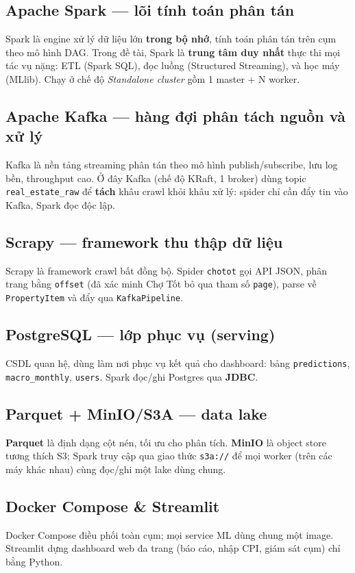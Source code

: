 \documentclass[12pt,a4paper]{article}
\begin{document}
\subsection{Apache Spark --- lõi tính toán phân tán}
Spark là engine xử lý dữ liệu lớn \textbf{trong bộ nhớ}, tính toán phân tán trên cụm theo mô hình DAG. Trong đề tài, Spark là \textbf{trung tâm duy nhất} thực thi mọi tác vụ nặng: ETL (Spark SQL), đọc luồng (Structured Streaming), và học máy (MLlib). Chạy ở chế độ \textit{Standalone cluster} gồm 1 master + N worker.

\subsection{Apache Kafka --- hàng đợi phân tách nguồn và xử lý}
Kafka là nền tảng streaming phân tán theo mô hình publish/subscribe, lưu log bền, throughput cao. Ở đây Kafka (chế độ KRaft, 1 broker) dùng topic \texttt{real\_estate\_raw} để \textbf{tách} khâu crawl khỏi khâu xử lý: spider chỉ cần đẩy tin vào Kafka, Spark đọc độc lập.

\subsection{Scrapy --- framework thu thập dữ liệu}
Scrapy là framework crawl bất đồng bộ. Spider \texttt{chotot} gọi API JSON, phân trang bằng \texttt{offset} (đã xác minh Chợ Tốt bỏ qua tham số \texttt{page}), parse về \texttt{PropertyItem} và đẩy qua \texttt{KafkaPipeline}.

\subsection{PostgreSQL --- lớp phục vụ (serving)}
CSDL quan hệ, dùng làm nơi phục vụ kết quả cho dashboard: bảng \texttt{predictions}, \texttt{macro\_monthly}, \texttt{users}. Spark đọc/ghi Postgres qua \textbf{JDBC}.

\subsection{Parquet + MinIO/S3A --- data lake}
\textbf{Parquet} là định dạng cột nén, tối ưu cho phân tích. \textbf{MinIO} là object store tương thích S3; Spark truy cập qua giao thức \texttt{s3a://} để mọi worker (trên các máy khác nhau) cùng đọc/ghi một lake dùng chung.

\subsection{Docker Compose \& Streamlit}
Docker Compose điều phối toàn cụm; mọi service ML dùng chung một image. Streamlit dựng dashboard web đa trang (báo cáo, nhập CPI, giám sát cụm) chỉ bằng Python.
\end{document}
